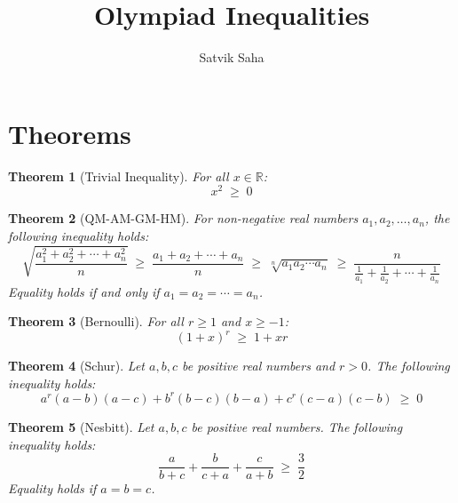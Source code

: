 \documentclass[11pt, reqno]{article}
\newtheorem{theorem}{Theorem}
\begin{document}
\title{Olympiad Inequalities}
\author{Satvik Saha}
\date{}
\maketitle

\section*{Theorems}

\begin{theorem}[Trivial Inequality]
For all $x \in \mathbb{R}$:
\begin{equation*}
	x^2		\;\geq\;	0
\end{equation*}
\end{theorem}

\begin{theorem}[QM-AM-GM-HM]
For non-negative real numbers $a_1, a_2, \dots, a_n$, the following inequality holds:
\begin{equation*}
	\sqrt{\dfrac{a_1^2 + a_2^2 + \cdots + a_n^2}{n}}	\;\geq\;		\dfrac{a_1 + a_2 + \cdots + a_n}{n}		\;\geq\;
	\sqrt[n]{a_1a_2\cdots a_n}		\;\geq\;		\dfrac{n}{\frac{1}{a_1} + \frac{1}{a_2} + \cdots + \frac{1}{a_n}}
\end{equation*}
Equality holds if and only if $a_1 = a_2 = \cdots = a_n$.
\end{theorem}

\begin{theorem}[Bernoulli]
For all $r \geq 1$ and $x \geq -1$:
\begin{equation*}
	(1 + x)^r	\;\geq\;		1 + xr
\end{equation*}
\end{theorem}

\begin{theorem}[Schur]
Let $a, b, c$ be positive real numbers and $r > 0$. The following inequality holds:
\begin{equation*}
	a^r(a-b)(a-c) + b^r(b-c)(b-a) + c^r(c-a)(c-b)	\;\geq\;		0
\end{equation*}
\end{theorem}

\begin{theorem}[Nesbitt]
Let $a, b, c$ be positive real numbers. The following inequality holds:
\begin{equation*}
	\dfrac{a}{b+c} + \dfrac{b}{c+a} + \dfrac{c}{a+b}		\;\geq\;		\dfrac{3}{2}
\end{equation*}
Equality holds if $a = b = c$.
\end{theorem}
\end{document}
